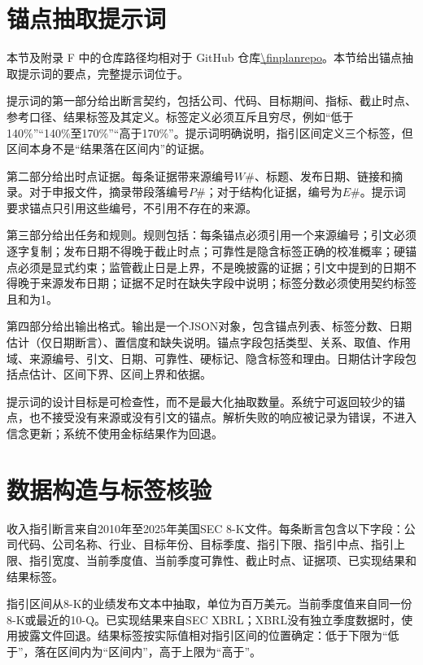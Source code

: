 \appendix

\chapter{锚点抽取提示词}
\label{app:prompt}

本节及附录 F 中的仓库路径均相对于 GitHub 仓库\url{\finplanrepo}。本节给出锚点抽取提示词的要点，完整提示词位于。

提示词的第一部分给出断言契约，包括公司、代码、目标期间、指标、截止时点、参考口径、结果标签及其定义。标签定义必须互斥且穷尽，例如“低于140\%”“140\%至170\%”“高于170\%”。提示词明确说明，指引区间定义三个标签，但区间本身不是“结果落在区间内”的证据。

第二部分给出时点证据。每条证据带来源编号$W\#$、标题、发布日期、链接和摘录。对于申报文件，摘录带段落编号$P\#$；对于结构化证据，编号为$E\#$。提示词要求锚点只引用这些编号，不引用不存在的来源。

第三部分给出任务和规则。规则包括：每条锚点必须引用一个来源编号；引文必须逐字复制；发布日期不得晚于截止时点；可靠性是隐含标签正确的校准概率；硬锚点必须是显式约束；监管截止日是上界，不是晚披露的证据；引文中提到的日期不得晚于来源发布日期；证据不足时在缺失字段中说明；标签分数必须使用契约标签且和为1。

第四部分给出输出格式。输出是一个JSON对象，包含锚点列表、标签分数、日期估计（仅日期断言）、置信度和缺失说明。锚点字段包括类型、关系、取值、作用域、来源编号、引文、日期、可靠性、硬标记、隐含标签和理由。日期估计字段包括点估计、区间下界、区间上界和依据。

提示词的设计目标是可检查性，而不是最大化抽取数量。系统宁可返回较少的锚点，也不接受没有来源或没有引文的锚点。解析失败的响应被记录为错误，不进入信念更新；系统不使用金标结果作为回退。

\chapter{数据构造与标签核验}
\label{app:data}

收入指引断言来自2010年至2025年美国SEC 8-K文件。每条断言包含以下字段：公司代码、公司名称、行业、目标年份、目标季度、指引下限、指引中点、指引上限、指引宽度、当前季度值、当前季度可靠性、截止时点、证据项、已实现结果和结果标签。

指引区间从8-K的业绩发布文本中抽取，单位为百万美元。当前季度值来自同一份8-K或最近的10-Q。已实现结果来自SEC XBRL；XBRL没有独立季度数据时，使用披露文件回退。结果标签按实际值相对指引区间的位置确定：低于下限为“低于”，落在区间内为“区间内”，高于上限为“高于”。

